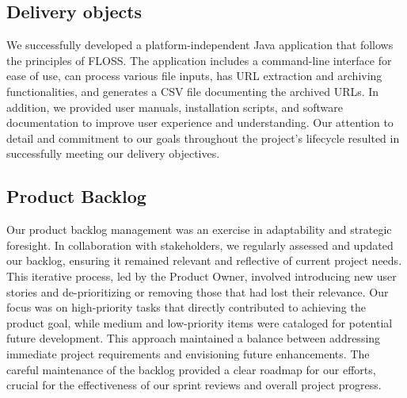 \subsection{Delivery objects}
We successfully developed a platform-independent Java application that follows the principles of FLOSS.
The application includes a command-line interface for ease of use, can process various file inputs, has URL extraction and archiving functionalities, and generates a CSV file documenting the archived URLs.
In addition, we provided user manuals, installation scripts, and software documentation to improve user experience and understanding.
Our attention to detail and commitment to our goals throughout the project's lifecycle resulted in successfully meeting our delivery objectives.

\subsection{Product Backlog}
Our product backlog management was an exercise in adaptability and strategic foresight.
In collaboration with stakeholders, we regularly assessed and updated our backlog, ensuring it remained relevant and reflective of current project needs.
This iterative process, led by the Product Owner, involved introducing new user stories and de-prioritizing or removing those that had lost their relevance.
Our focus was on high-priority tasks that directly contributed to achieving the product goal, while medium and low-priority items were cataloged for potential future development.
This approach maintained a balance between addressing immediate project requirements and envisioning future enhancements.
The careful maintenance of the backlog provided a clear roadmap for our efforts, crucial for the effectiveness of our sprint reviews and overall project progress.

